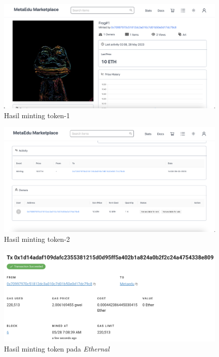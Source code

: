 \begin{itemize}
\begin{figure} [H]
        \includegraphics[scale=0.3]{gambar/img-test-buy-mint-2.png}
        \caption{Hasil minting token-1}
        \label{fig:TestBuyHasilMinting}
      \end{figure}
      \begin{figure} [H] \centering
        \includegraphics[scale=0.3]{gambar/img-test-buy-mint-3.png}
        \caption{Hasil minting token-2}
        \label{fig:TestBuyHasilMinting}
      \end{figure}
      \begin{figure} [H] \centering
        \includegraphics[scale=0.4]{gambar/img-test-buy-mint-4.png}
        \caption{Hasil minting token pada \emph{Ethernal}}
        \label{fig:TestBuyHasilMinting}
      \end{figure}

\end{itemize}
